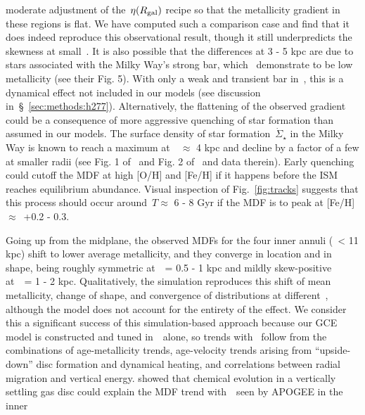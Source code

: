\documentclass[draft2.tex]{subfiles}
\begin{document}
moderate adjustment of the~$\eta(R_\text{gal})$ recipe so that the metallicity 
gradient in these regions is flat. 
We have computed such a comparison case and find that it does indeed reproduce 
this observational result, though it still underpredicts the skewness at 
small~\rgal. 
It is also possible that the differences at 3 - 5 kpc are due to stars 
associated with the Milky Way's strong bar, which~\citet{Bovy2019} demonstrate 
to be low metallicity (see their Fig. 5). 
With only a weak and transient bar in~\hsim, this is a dynamical effect not 
included in our models (see discussion in~\S~\ref{sec:methods:h277}). 
Alternatively, the flattening of the observed gradient could be a consequence 
of more aggressive quenching of star formation than assumed in our models. 
The surface density of star formation~$\dot{\Sigma}_\star$ in the Milky Way 
is known to reach a maximum at~\rgal~$\approx$ 4 kpc and decline by a factor 
of a few at smaller radii (see Fig. 1 of~\citealp{Peek2009} and Fig. 2 
of~\citealp{Fraternali2012} and data therein). 
Early quenching could cutoff the MDF at high [O/H] and [Fe/H] if it happens 
before the ISM reaches equilibrium abundance. 
Visual inspection of Fig.~\ref{fig:tracks} suggests that this process should 
occur around~$T \approx$ 6 - 8 Gyr if the MDF is to peak at 
[Fe/H]~$\approx$~+0.2 - 0.3. 
\par 
Going up from the midplane, the observed MDFs for the four inner annuli 
(\rgal~< 11 kpc) shift to lower average metallicity, and they converge in 
location and in shape, being roughly symmetric at~\absz~= 0.5 - 1 kpc and 
mildly skew-positive at~\absz~= 1 - 2 kpc. 
Qualitatively, the simulation reproduces this shift of mean metallicity, change 
of shape, and convergence of distributions at different~\rgal, although the 
model does not account for the entirety of the effect. 
We consider this a significant success of this simulation-based approach 
because our GCE model is constructed and tuned in~\rgal~alone, so trends with 
\absz~follow from the combinations of age-metallicity trends, age-velocity 
trends arising from ``upside-down'' disc formation and dynamical heating, and 
correlations between radial migration and vertical energy. 
\citet{Freudenburg2017} showed that chemical evolution in a vertically settling 
gas disc could explain the MDF trend with~\absz~seen by APOGEE in the inner 
\end{document}
